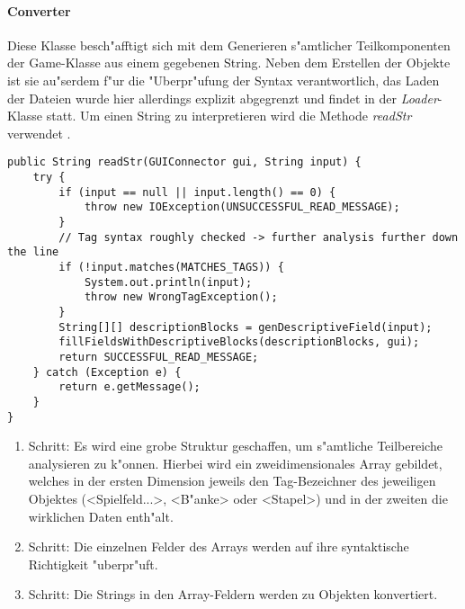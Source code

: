 \paragraph{Converter}
\label{par:converter}
\FloatBarrier
Diese Klasse besch"afftigt sich mit dem Generieren s"amtlicher Teilkomponenten der Game-Klasse aus einem gegebenen String. Neben dem Erstellen der Objekte ist sie au"serdem f"ur die "Uberpr"ufung der Syntax verantwortlich, das Laden der Dateien wurde hier allerdings explizit abgegrenzt und findet in der \emph{Loader}-Klasse statt. Um einen String zu interpretieren wird die Methode \emph{readStr} verwendet . 
\begin{lstlisting}[style=CodeHighlighting,float,caption=Converter - readStr,label=lst:converter_readStr]
public String readStr(GUIConnector gui, String input) {
    try {
        if (input == null || input.length() == 0) {
            throw new IOException(UNSUCCESSFUL_READ_MESSAGE);
        }
        // Tag syntax roughly checked -> further analysis further down the line
        if (!input.matches(MATCHES_TAGS)) {
            System.out.println(input);
            throw new WrongTagException();
        }
        String[][] descriptionBlocks = genDescriptiveField(input);
        fillFieldsWithDescriptiveBlocks(descriptionBlocks, gui);
        return SUCCESSFUL_READ_MESSAGE;
    } catch (Exception e) {
        return e.getMessage();
    }
}
\end{lstlisting}

\begin{enumerate}
	\item Schritt: Es wird eine grobe Struktur geschaffen, um s"amtliche Teilbereiche analysieren zu k"onnen. Hierbei wird ein zweidimensionales Array gebildet, welches in der ersten Dimension jeweils den Tag-Bezeichner des jeweiligen Objektes (<Spielfeld...>, <B"anke> oder <Stapel>) und in der zweiten die wirklichen Daten enth"alt. 
	\item Schritt: Die einzelnen Felder des Arrays werden auf ihre syntaktische Richtigkeit "uberpr"uft.
	\item Schritt: Die Strings in den Array-Feldern werden zu Objekten konvertiert. 
\end{enumerate}

